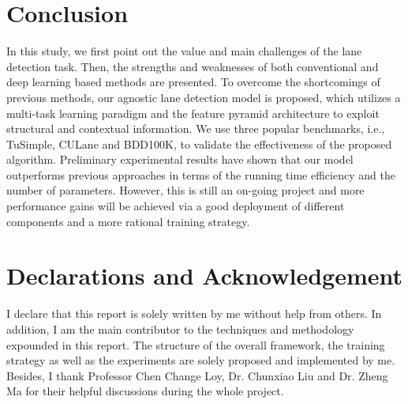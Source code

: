 \documentclass[draftcls]{IEEEtran}
\begin{document}
\section{Conclusion}

In this study, we first point out the value and main challenges of the lane detection task. Then, the strengths and weaknesses of both conventional and deep learning based methods are presented. To overcome the shortcomings of previous methods, our agnostic lane detection model is proposed, which utilizes a multi-task learning paradigm and the feature pyramid architecture to exploit structural and contextual information. We use three popular benchmarks, i.e., TuSimple, CULane and BDD100K, to validate the effectiveness of the proposed algorithm. Preliminary experimental results have shown that our model outperforms previous approaches in terms of the running time efficiency and the number of parameters. However, this is still an on-going project and more performance gains will be achieved via a good deployment of different components and a more rational training strategy.     

\section{Declarations and Acknowledgement}

I declare that this report is solely written by me without help from others. In addition, I am the main contributor to the techniques and methodology expounded in this report. The structure of the overall framework, the training strategy as well as the experiments are solely proposed and implemented by me. Besides, I thank Professor Chen Change Loy, Dr. Chunxiao Liu and Dr. Zheng Ma for their helpful discussions during the whole project.



\end{document}
